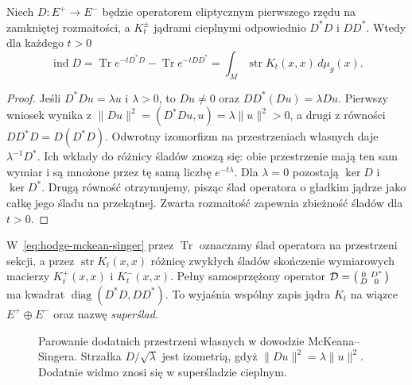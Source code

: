 \begin{lemat}
\label{lem:hodge-mckean-singer}
Niech \(D:E^+\to E^-\) będzie operatorem eliptycznym
pierwszego rzędu na zamkniętej rozmaitości, a \(K_t^\pm\)
jądrami cieplnymi odpowiednio \(D^*D\) i \(DD^*\).
Wtedy dla każdego \(t>0\)
\begin{equation}\label{eq:hodge-mckean-singer}
 \operatorname{ind}D
 =\operatorname{Tr}e^{-tD^*D}
  -\operatorname{Tr}e^{-tDD^*}
 =\int_M\operatorname{str}K_t(x,x)\,d\mu_g(x).
\end{equation}
\end{lemat}
\begin{proof}
Jeśli \(D^*Du=\lambda u\) i \(\lambda>0\), to
\(Du\ne0\) oraz \(DD^*(Du)=\lambda Du\).
Pierwszy wniosek wynika z
$\|Du\|^2=(D^*Du,u)=\lambda\|u\|^2>0$,
a drugi z równości $DD^*D=D(D^*D)$.
Odwrotny izomorfizm na przestrzeniach własnych
daje \(\lambda^{-1}D^*\). Ich wkłady do różnicy
śladów znoszą się: obie przestrzenie mają ten sam wymiar
i są mnożone przez tę samą liczbę $e^{-t\lambda}$.
Dla \(\lambda=0\) pozostają
\(\ker D\) i \(\ker D^*\). Drugą równość otrzymujemy,
pisząc ślad operatora o gładkim jądrze jako całkę
jego śladu na przekątnej. Zwarta rozmaitość
zapewnia zbieżność śladów dla \(t>0\).
\end{proof}

W~\eqref{eq:hodge-mckean-singer} przez $\operatorname{Tr}$
oznaczamy ślad operatora na przestrzeni sekcji, a przez
$\operatorname{str}K_t(x,x)$ różnicę zwykłych śladów
skończenie wymiarowych macierzy $K_t^+(x,x)$ i $K_t^-(x,x)$.
Pełny samosprzężony operator
$\mathcal D=\begin{psmallmatrix}0&D^*\\D&0\end{psmallmatrix}$
ma kwadrat $\operatorname{diag}(D^*D,DD^*)$.
To wyjaśnia wspólny zapis jądra $K_t$ na wiązce
$E^+\oplus E^-$ oraz nazwę \emph{superślad}.

\begin{figure}[H]
\centering
{}
\caption{Parowanie dodatnich przestrzeni własnych w dowodzie
McKeana--Singera. Strzałka $D/\sqrt\lambda$ jest izometrią,
gdyż $\|Du\|^2=\lambda\|u\|^2$.
Dodatnie widmo znosi się w superśladzie cieplnym.}
\label{fig:hodge-mckean-parowanie}
\end{figure}

